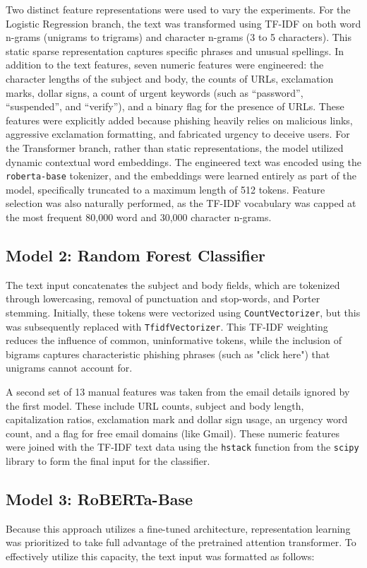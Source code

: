 \documentclass[11pt]{article}
\begin{document}
Two distinct feature representations were used to vary the experiments. For the Logistic Regression branch, the text was transformed using TF-IDF on both word n-grams (unigrams to trigrams) and character n-grams (3 to 5 characters). This static sparse representation captures specific phrases and unusual spellings. In addition to the text features, seven numeric features were engineered: the character lengths of the subject and body, the counts of URLs, exclamation marks, dollar signs, a count of urgent keywords (such as ``password'', ``suspended'', and ``verify''), and a binary flag for the presence of URLs. These features were explicitly added because phishing heavily relies on malicious links, aggressive exclamation formatting, and fabricated urgency to deceive users. For the Transformer branch, rather than static representations, the model utilized dynamic contextual word embeddings. The engineered text was encoded using the \texttt{roberta-base} tokenizer, and the embeddings were learned entirely as part of the model, specifically truncated to a maximum length of 512 tokens. Feature selection was also naturally performed, as the TF-IDF vocabulary was capped at the most frequent 80,000 word and 30,000 character n-grams.

\subsection{Model 2: Random Forest Classifier}
The text input concatenates the subject and body fields, which are tokenized through lowercasing, removal of punctuation and stop-words, and Porter stemming. Initially, these tokens were vectorized using \texttt{CountVectorizer}, but this was subsequently replaced with \texttt{TfidfVectorizer}. This TF-IDF weighting reduces the influence of common, uninformative tokens, while the inclusion of bigrams captures characteristic phishing phrases (such as "click here") that unigrams cannot account for.

A second set of 13 manual features was taken from the email details ignored by the first model. These include URL counts, subject and body length, capitalization ratios, exclamation mark and dollar sign usage, an urgency word count, and a flag for free email domains (like Gmail). These numeric features were joined with the TF-IDF text data using the \texttt{hstack} function from the \texttt{scipy} library to form the final input for the classifier.

\subsection{Model 3: RoBERTa-Base}
Because this approach utilizes a fine-tuned architecture, representation learning was prioritized to take full advantage of the pretrained attention transformer. To effectively utilize this capacity, the text input was formatted as follows:
\end{document}
